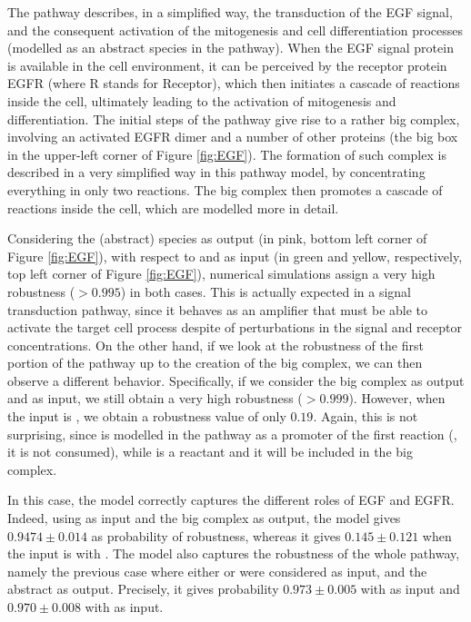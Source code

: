 The pathway describes, in a simplified way, the transduction of the EGF signal, and the consequent activation of the mitogenesis and cell differentiation processes (modelled as an abstract species in the pathway). When the EGF signal protein is available in the cell environment, it can be perceived by the receptor protein EGFR (where R stands for Receptor), which then initiates a cascade of reactions inside the cell, ultimately leading to the activation of mitogenesis and differentiation. The initial steps of the pathway give rise to a rather big complex, involving an activated EGFR dimer and a number of other proteins (the big box in the upper-left corner of Figure \ref{fig:EGF}). The formation of such complex is described in a very simplified way in this pathway model, by concentrating everything in only two reactions. The big complex then promotes a cascade of reactions inside the cell, which are modelled more in detail.

Considering the   (abstract) species as output (in pink, bottom left corner of Figure \ref{fig:EGF}), with respect to  and  as input (in green and yellow, respectively, top left corner of Figure \ref{fig:EGF}), numerical simulations assign a very high robustness ($>0.995$) in both cases. This is actually expected in a signal transduction pathway, since it behaves as an amplifier that must be able to activate the target cell process despite of perturbations in the signal and receptor concentrations. On the other hand, if we look at the robustness of the first portion of the pathway up to the creation of the big complex, we can then observe a different behavior. Specifically, if we consider the big complex as output and  as input, we still obtain a very high robustness ($>0.999$). However, when the input is , we obtain a robustness value of only $0.19$. Again, this is not surprising, since  is modelled in the pathway as a promoter of the first reaction (\ie, it is not consumed), while  is a reactant and it will be included in the big complex.

In this case, the model correctly captures the different roles of EGF and EGFR. Indeed, using  as input and the big complex as output, the model gives $0.9474 \pm 0.014$ as probability of robustness, whereas it gives $0.145 \pm 0.121$ when the input is with . The model also captures the robustness of the whole pathway, namely the previous case where either  or  were considered as input, and the abstract   as output. Precisely, it gives probability $0.973 \pm 0.005$ with  as input and $0.970 \pm 0.008$ with  as input.